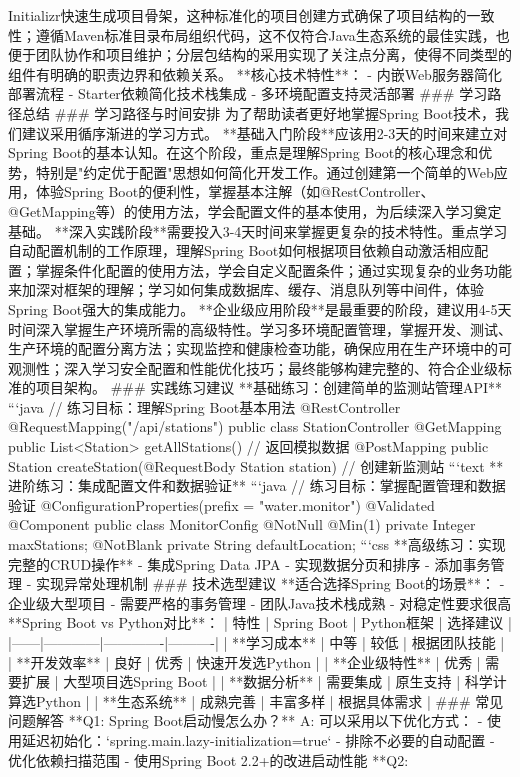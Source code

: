 Initializr快速生成项目骨架，这种标准化的项目创建方式确保了项目结构的一致性；遵循Maven标准目录布局组织代码，这不仅符合Java生态系统的最佳实践，也便于团队协作和项目维护；分层包结构的采用实现了关注点分离，使得不同类型的组件有明确的职责边界和依赖关系。 **核心技术特性**： - 内嵌Web服务器简化部署流程 - Starter依赖简化技术栈集成 - 多环境配置支持灵活部署 ### 学习路径总结 ### 学习路径与时间安排 为了帮助读者更好地掌握Spring Boot技术，我们建议采用循序渐进的学习方式。 **基础入门阶段**应该用2-3天的时间来建立对Spring Boot的基本认知。在这个阶段，重点是理解Spring Boot的核心理念和优势，特别是"约定优于配置"思想如何简化开发工作。通过创建第一个简单的Web应用，体验Spring Boot的便利性，掌握基本注解（如@RestController、@GetMapping等）的使用方法，学会配置文件的基本使用，为后续深入学习奠定基础。 **深入实践阶段**需要投入3-4天时间来掌握更复杂的技术特性。重点学习自动配置机制的工作原理，理解Spring Boot如何根据项目依赖自动激活相应配置；掌握条件化配置的使用方法，学会自定义配置条件；通过实现复杂的业务功能来加深对框架的理解；学习如何集成数据库、缓存、消息队列等中间件，体验Spring Boot强大的集成能力。 **企业级应用阶段**是最重要的阶段，建议用4-5天时间深入掌握生产环境所需的高级特性。学习多环境配置管理，掌握开发、测试、生产环境的配置分离方法；实现监控和健康检查功能，确保应用在生产环境中的可观测性；深入学习安全配置和性能优化技巧；最终能够构建完整的、符合企业级标准的项目架构。 ### 实践练习建议 **基础练习：创建简单的监测站管理API** ```java // 练习目标：理解Spring Boot基本用法 @RestController @RequestMapping("/api/stations") public class StationController { @GetMapping public List<Station> getAllStations() { // 返回模拟数据 } @PostMapping public Station createStation(@RequestBody Station station) { // 创建新监测站 } } ```text **进阶练习：集成配置文件和数据验证** ```java // 练习目标：掌握配置管理和数据验证 @ConfigurationProperties(prefix = "water.monitor") @Validated @Component public class MonitorConfig { @NotNull @Min(1) private Integer maxStations; @NotBlank private String defaultLocation; } ```css **高级练习：实现完整的CRUD操作** - 集成Spring Data JPA - 实现数据分页和排序 - 添加事务管理 - 实现异常处理机制 ### 技术选型建议 **适合选择Spring Boot的场景**： - 企业级大型项目 - 需要严格的事务管理 - 团队Java技术栈成熟 - 对稳定性要求很高 **Spring Boot vs Python对比**： | 特性 | Spring Boot | Python框架 | 选择建议 | |------|------------|-------------|----------| | **学习成本** | 中等 | 较低 | 根据团队技能 | | **开发效率** | 良好 | 优秀 | 快速开发选Python | | **企业级特性** | 优秀 | 需要扩展 | 大型项目选Spring Boot | | **数据分析** | 需要集成 | 原生支持 | 科学计算选Python | | **生态系统** | 成熟完善 | 丰富多样 | 根据具体需求 | ### 常见问题解答 **Q1: Spring Boot启动慢怎么办？** A: 可以采用以下优化方式： - 使用延迟初始化：`spring.main.lazy-initialization=true` - 排除不必要的自动配置 - 优化依赖扫描范围 - 使用Spring Boot 2.2+的改进启动性能 **Q2: 